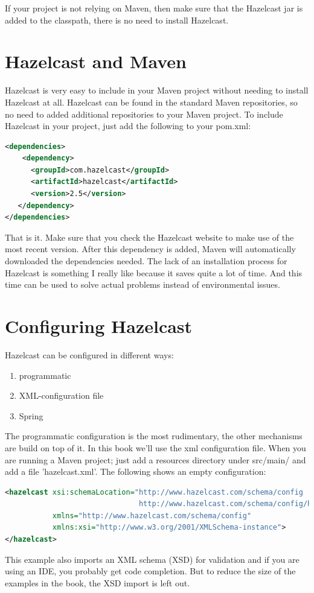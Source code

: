 If your project is not relying on Maven, then make sure that the Hazelcast jar is added to the classpath, there is no need to install Hazelcast.

\section{Hazelcast and Maven}
Hazelcast is very easy to include in your Maven project without needing to install Hazelcast at all. Hazelcast can be found in the standard Maven repositories, so no need to added additional repositories to your Maven project. To include Hazelcast in your project, just add the following to your pom.xml:
\begin{lstlisting}[language=xml]
<dependencies>	
    <dependency>
      <groupId>com.hazelcast</groupId>
      <artifactId>hazelcast</artifactId>
      <version>2.5</version>
   </dependency>
</dependencies>
\end{lstlisting}
That is it. Make sure that you check the Hazelcast website to make use of the most recent version. After this dependency is added, Maven will automatically downloaded the dependencies needed. The lack of an installation process for Hazelcast is something I really like because it saves quite a lot of time. And this time can be used to solve actual problems instead of environmental issues.

\section{Configuring Hazelcast}
Hazelcast can be configured in different ways:
\begin{enumerate}
\item programmatic
\item XML-configuration file
\item Spring
\end{enumerate}
The programmatic configuration is the most rudimentary, the other mechanisms are build on top of it. In this book we'll use the xml configuration file. When you are running a Maven project; just add a resources directory under src/main/ and add a file 'hazelcast.xml'. The following shows an empty configuration:
\begin{lstlisting}[language=xml]
<hazelcast xsi:schemaLocation="http://www.hazelcast.com/schema/config
                               http://www.hazelcast.com/schema/config/hazelcast-config-2.5.xsd"
           xmlns="http://www.hazelcast.com/schema/config"
           xmlns:xsi="http://www.w3.org/2001/XMLSchema-instance">
</hazelcast>
\end{lstlisting}
This example also imports an XML schema (XSD) for validation and if you are using an IDE, you probably get code completion. But to reduce the size of the examples in the book, the XSD import is left out.

